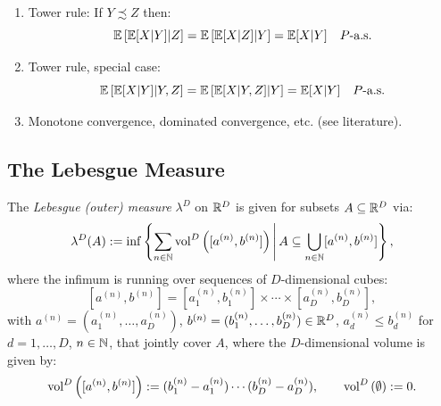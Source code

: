 \begin{Thm}
\begin{enumerate}
        \item Tower rule: If $Y \precsim Z$ then:
            \[ \mathbb{E}\left [\mathbb{E}[X|Y]|Z\right ] = \mathbb{E}\left [\mathbb{E}[X|Z]|Y\right ] = \mathbb{E}[X|Y]\quad P\text{-a.s.}    \]
        \item Tower rule, special case:
            \[ \mathbb{E}\left [\mathbb{E}[X|Y]|Y,Z\right ] = \mathbb{E}\left [\mathbb{E}[X|Y,Z]|Y\right ] = \mathbb{E}[X|Y]\quad P\text{-a.s.}    \]
        \item Monotone convergence, dominated convergence, etc. (see literature).
    \end{enumerate}
\end{Thm}


\subsection{The Lebesgue Measure}

\begin{Def}
    \label{thm-lebesgue-measure}
    The \emph{Lebesgue (outer) measure} $\lambda^D$ on $\mathbb{R}^D$ is given for subsets $A \subseteq \mathbb{R}^D$ via:
    \[ \lambda^D(A) := \inf\left \{ \sum_{n \in \mathbb{N}} \mathrm{vol}^D\left ( [a^{(n)},b^{(n)}] \right )  \,\middle|\,  
    A \subseteq \bigcup_{n \in \mathbb{N}} [a^{(n)},b^{(n)}]  \right \}, \]
    where the infimum is running over sequences of $D$-dimensional cubes:
     \[ [a^{(n)},b^{(n)}] = [a_1^{(n)},b_1^{(n)}] \times \cdots \times [a_D^{(n)}, b_D^{(n)}],\]
  with $a^{(n)}=(a_1^{(n)},\dots,a_D^{(n)})$, $b^{(n)}=(b_1^{(n)},\dots,b_D^{(n)}) \in \mathbb{R}^D$, $a_d^{(n)} \le b_d^{(n)}$ for $d=1,\dots,D$, $n \in \mathbb{N}$, that jointly cover $A$, where the $D$-dimensional volume is given by:
  \[ \mathrm{vol}^D\left ( [a^{(n)},b^{(n)}] \right ) := (b_1^{(n)}-a_1^{(n)}) \cdots (b_D^{(n)}-a_D^{(n)}),\qquad \mathrm{vol}^D\left ( \emptyset \right ) :=0. \]
\end{Def}


